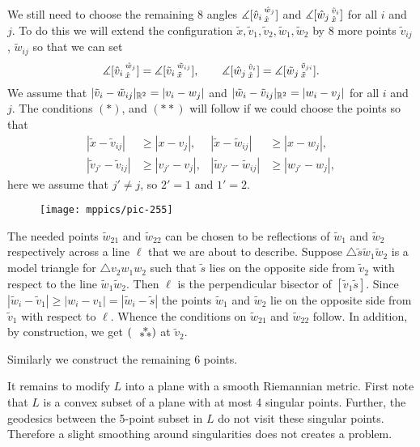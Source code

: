 \documentclass{article}
\begin{document}
We still need to choose the remaining 8 angles $\measuredangle [\hat v_i\,{}^{\hat w_j}_{\hat x}]$ and $\measuredangle [\hat w_j\,{}^{\hat v_i}_{\hat x}]$ for all $i$ and $j$.
To do this we will extend the configuration $\tilde x,\tilde v_1,\tilde v_2,\tilde w_1,\tilde w_2$ by 8 more points 
$\tilde v_{ij}$, $\tilde w_{ij}$ so that we can set 
\[
\measuredangle [\hat v_i\,{}^{\hat w_j}_{\hat x}]=\measuredangle [\tilde v_i\,{}^{\tilde w_{ij}}_{\tilde x}],
\qquad
\measuredangle [\hat w_j\,{}^{\hat v_i}_{\hat x}]=\measuredangle [\tilde w_j\,{}^{\tilde v_{ji}}_{\tilde x}].
\]
We assume that $|\tilde v_i-\tilde w_{ij}|_{\mathbb{R}^2}=|v_i-w_j|$ and $|\tilde w_i-\tilde v_{ij}|_{\mathbb{R}^2}=|w_i-v_j|$ for all $i$ and~$j$.
The conditions $({*})$, and $({*}{*})$ will follow if we could choose the points so that
\begin{align*}
|\tilde x-\tilde v_{ij}|&\ge | x-v_j|,
&
|\tilde x-\tilde w_{ij}|&\ge | x-w_j|,
\\
|\tilde v_{j'}-\tilde v_{ij}|&\ge | v_{j'}-v_j|,
&
|\tilde w_{j'}-\tilde w_{ij}|&\ge |w_{j'}-w_j|,
\end{align*}
here we assume that $j'\ne j$, so $2'=1$ and $1'=2$.

\begin{wrapfigure}{r}{35mm}
\vskip-4mm
\centering
\texttt{[image: mppics/pic-255]}
\end{wrapfigure}

The needed points $\tilde w_{21}$ and $\tilde w_{22}$ can be chosen to be reflections of $\tilde w_{1}$ and $\tilde w_{2}$ respectively across a line $\ell$ that we are about to describe.
Suppose $\triangle \tilde s\tilde w_1 \tilde w_2$ is a model triangle for $\triangle v_2w_1w_2$ such that $\tilde s$ lies on the opposite side from $\tilde v_2$ with respect to the line $\tilde w_1\tilde w_2$.
Then $\ell$ is the perpendicular bisector of $[\tilde v_1 \tilde s]$.
Since $|\tilde w_i-\tilde v_1|\ge | w_i- v_1|=|\tilde w_i-\tilde s|$ the points $\tilde w_1$ and $\tilde w_2$ lie on the opposite side from $\tilde v_1$ with respect to $\ell$.
Whence the conditions on $\tilde w_{21}$ and $\tilde w_{22}$ follow.
In addition, by construction, we get $(\asterism)$ at $\tilde v_2$.

Similarly we construct the remaining 6 points.

 It remains to modify $L$ into a plane with a smooth Riemannian metric.
First note that $L$ is a convex subset of a plane with at most 4 singular points.
Further, the geodesics between the 5-point subset in $L$ do not visit these singular points.
Therefore a slight smoothing around singularities does not creates a problem.
\qeds
\end{document}
